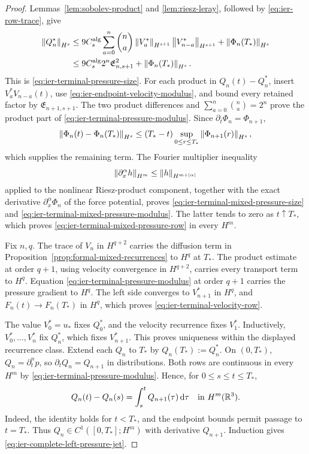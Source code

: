 \begin{proof}
Lemmas~\ref{lem:sobolev-product} and \ref{lem:riesz-leray}, followed by
\eqref{eq:ier-row-trace}, give
\begin{align*}
 \left\lVert Q_n^*\right\rVert_{H^s}
 &\le9C_s^{\rm alg}\sum_{a=0}^{n}\binom na
 \left\lVert V_a^*\right\rVert_{H^{s+1}}\left\lVert V_{n-a}^*\right\rVert_{H^{s+1}}
 +\left\lVert \Phi_n(T_*)\right\rVert_{H^s}\\
 &\le9C_s^{\rm alg}2^n\mathfrak E_{n,s+1}^2
 +\left\lVert \Phi_n(T_*)\right\rVert_{H^s}.
\end{align*}
This is \eqref{eq:ier-terminal-pressure-size}.
For each product in \(Q_n(t)-Q_n^*\), insert
\(V_a^*V_{n-a}(t)\), use
\eqref{eq:ier-endpoint-velocity-modulus}, and bound every retained factor by
\(\mathfrak E_{n+1,s+1}\).  The two product differences and
\(\sum_{a=0}^{n}\binom na=2^n\) prove
the product part of \eqref{eq:ier-terminal-pressure-modulus}.  Since
\(\partial_t\Phi_n=\Phi_{n+1}\),
\[
 \left\lVert \Phi_n(t)-\Phi_n(T_*)\right\rVert_{H^s}
 \le (T_*-t)\sup_{0\le r\le T_*}\left\lVert \Phi_{n+1}(r)\right\rVert_{H^s},
\]
which supplies the remaining term.  The Fourier multiplier inequality
\[
 \left\lVert \partial_x^\alpha h\right\rVert_{H^m}
 \le\left\lVert h\right\rVert_{H^{m+|\alpha|}}
\]
applied to the nonlinear Riesz-product component, together with the exact
derivative \(\partial_x^\alpha\Phi_n\) of the force potential, proves
\eqref{eq:ier-terminal-mixed-pressure-size} and
\eqref{eq:ier-terminal-mixed-pressure-modulus}.  The latter tends to zero
as \(t\uparrow T_*\), which proves
\eqref{eq:ier-terminal-mixed-pressure-row} in every \(H^m\).

Fix \(n,q\).  The trace of \(V_n\) in \(H^{q+2}\) carries the diffusion
term in Proposition~\ref{prop:formal-mixed-recurrences} to \(H^q\) at
\(T_*\).  The product estimate at order \(q+1\), using velocity convergence
in \(H^{q+2}\), carries every transport term to \(H^q\).  Equation
\eqref{eq:ier-terminal-pressure-modulus} at order \(q+1\) carries the pressure
gradient to \(H^q\).  The left side converges to \(V_{n+1}^*\) in \(H^q\),
and \(F_n(t)\to F_n(T_*)\) in \(H^q\), which proves
\eqref{eq:ier-terminal-velocity-row}.

The value \(V_0^*=u_*\) fixes \(Q_0^*\), and the velocity recurrence fixes
\(V_1^*\).  Inductively, \(V_0^*,\ldots,V_n^*\) fix \(Q_n^*\), which fixes
\(V_{n+1}^*\).  This proves uniqueness within the displayed recurrence
class.  Extend each \(Q_n\) to \(T_*\) by
\(Q_n(T_*):=Q_n^*\).  On \((0,T_*)\),
\(Q_n=\partial_t^np\), so \(\partial_tQ_n=Q_{n+1}\) in distributions.
Both rows are continuous in every \(H^m\) by
\eqref{eq:ier-terminal-pressure-modulus}.  Hence, for
\(0\le s\le t\le T_*\),
\begin{equation}
 Q_n(t)-Q_n(s)=\int_s^tQ_{n+1}(\tau)\,\mathrm d\tau
 \quad\text{in }H^m(\mathbb R^3).
 \label{eq:ier-pressure-banach-identity}
\end{equation}
Indeed, the identity holds for \(t<T_*\), and the endpoint bounds permit
passage to \(t=T_*\).  Thus
\(Q_n\in C^1([0,T_*];H^m)\) with derivative \(Q_{n+1}\).  Induction gives
\eqref{eq:ier-complete-left-pressure-jet}.
\end{proof}

